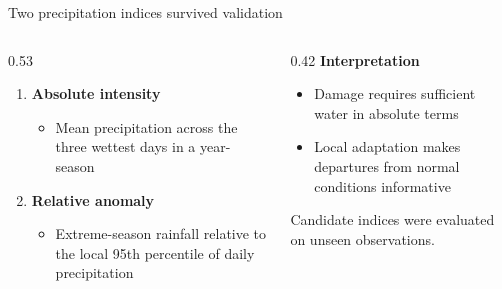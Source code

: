 \begin{frame}{Two precipitation indices survived validation}
  \begin{columns}[T,onlytextwidth]
    \begin{column}{0.53\textwidth}
      \begin{enumerate}
        \item \textbf{Absolute intensity}
          \begin{itemize}
            \item Mean precipitation across the three wettest days in
              a year-season
          \end{itemize}
        \item \textbf{Relative anomaly}
          \begin{itemize}
            \item Extreme-season rainfall relative to the local 95th
              percentile of daily precipitation
          \end{itemize}
      \end{enumerate}
    \end{column}
    \begin{column}{0.42\textwidth}
      \textbf{Interpretation}
      \begin{itemize}
        \item Damage requires sufficient water in absolute terms
        \item Local adaptation makes departures from normal
          conditions informative
      \end{itemize}

      Candidate indices were evaluated on unseen observations.
    \end{column}
  \end{columns}
\end{frame}


